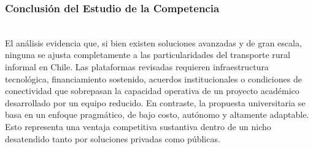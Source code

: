 \documentclass[12pt]{article}
\begin{document}
\subsubsection{Conclusión del Estudio de la Competencia}\\

El análisis evidencia que, si bien existen soluciones avanzadas y de gran escala, ninguna se ajusta completamente a las particularidades del transporte rural informal en Chile. Las plataformas revisadas requieren infraestructura tecnológica, financiamiento sostenido, acuerdos institucionales o condiciones de conectividad que sobrepasan la capacidad operativa de un proyecto académico desarrollado por un equipo reducido. En contraste, la propuesta universitaria se basa en un enfoque pragmático, de bajo costo, autónomo y altamente adaptable. Esto representa una ventaja competitiva sustantiva dentro de un nicho desatendido tanto por soluciones privadas como públicas.\\
\newpage
\end{document}
